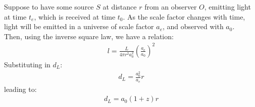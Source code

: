 \documentclass[../PhysUniverse.tex]{subfiles}
\begin{document}
Suppose to have some source $S$ at distance $r$ from an observer $O$, emitting light at time $t_e$, which is received at time $t_0$. As the scale factor changes with time, light will be emitted in a universe of scale factor $a_e$, and observed with $a_0$.\\
Then, using the inverse square law, we have a relation:
\begin{align*}
l = \frac{L}{4\pi r^2 a_0^2} \left( \frac{a_e}{a_0}\right)^2
\end{align*}
Substituting in $d_L$:\begin{align*}
d_L = \frac{a_0^2}{a_e} r
\end{align*}
leading to:
\begin{align*}
d_L = a_0(1+z)r
\end{align*}
\end{document}
